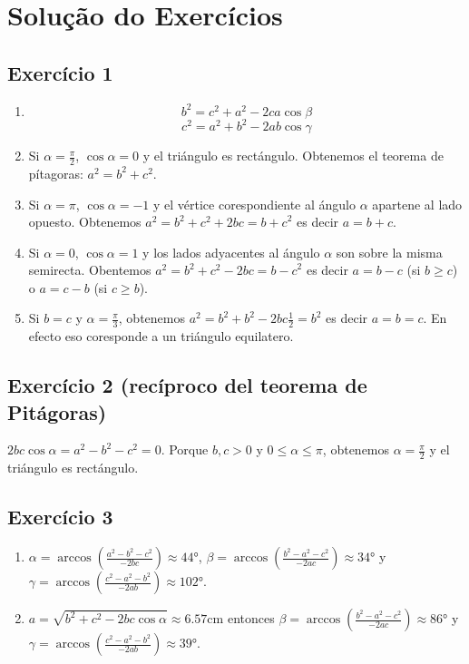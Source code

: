 \section{Solução do Exercícios}

\subsection{Exercício 1}

\begin{enumerate}
\item
  $$b^2 = c^2 + a^2 - {2ca \cos \beta}$$
  $$c^2 = a^2 + b^2 - {2ab \cos \gamma}$$

\item Si $\alpha = \frac{\pi}{2}$, $\cos \alpha = 0$ y el triángulo es
  rectángulo. Obtenemos el teorema de pítagoras: $a^2 = b^2+c^2$.
\item Si $\alpha = \pi$, $\cos \alpha = -1$ y el vértice corespondiente
  al ángulo $\alpha$ apartene al lado opuesto. Obtenemos
  $a^2 = b^2 + c^2 + {2bc} = {b+c}^2$ es decir $a = b + c$.
\item Si $\alpha = 0$, $\cos \alpha = 1$ y los lados adyacentes al ángulo
  $\alpha$ son sobre la misma semirecta. Obentemos
  $a^2 = b^2 + c^2 - {2bc} = {b-c}^2$ es decir $a = b - c$ (si $b \geq c$) o
  $a = c - b$ (si $c \geq b$).
\item Si $b = c$ y $\alpha = \frac{\pi}{3}$, obtenemos
  $a^2 = b^2 + b^2 - {2bc\frac{1}{2}} = b^2$ es decir $a=b=c$. En efecto
  eso coresponde a un triángulo equilatero.

\end{enumerate}

\subsection{Exercício 2 (recíproco del teorema de Pitágoras)}

$2bc \cos \alpha = a^2 - b^2 - c^2 = 0$. Porque $b, c > 0$ y
$0 \leq \alpha \leq \pi$, obtenemos $\alpha = \frac{\pi}{2}$ y el triángulo
es rectángulo.

\subsection{Exercício 3}

\begin{enumerate}
  \item
    $\alpha =
    \arccos \left( \frac{a^2-b^2-c^2}{-2bc} \right) \approx
    44°$,
    $\beta =
    \arccos \left( \frac{b^2-a^2-c^2}{-2ac} \right) \approx 34°$ y
    $\gamma =
    \arccos \left( \frac{c^2-a^2-b^2}{-2ab} \right) \approx 102°$.
  \item
    $a = \sqrt{b^2 + c^2 - {2bc \cos \alpha}} \approx
    6.57 \text{cm}$ entonces
    $\beta =
    \arccos \left( \frac{b^2-a^2-c^2}{-2ac} \right) \approx 86°$ y
    $\gamma =
    \arccos \left( \frac{c^2-a^2-b^2}{-2ab} \right) \approx 39°$.
\end{enumerate}

